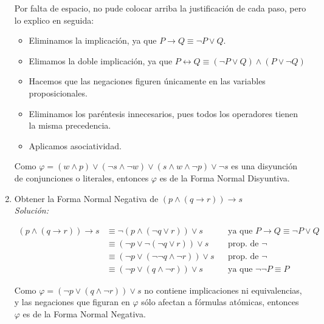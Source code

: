 \documentclass[letterpaper,10pt]{article}
\begin{document}
\begin{enumerate}
        Por falta de espacio, no pude colocar arriba la justificación de cada 
        paso, pero lo explico en seguida:

        \begin{itemize}
            \item Eliminamos la implicación, ya que 
            $P \rightarrow Q \equiv \neg P \lor Q$.
            \item Elimamos la doble implicación, ya que 
            $P \leftrightarrow Q \equiv (\neg P \lor Q) \land (P \lor \neg Q)$
            \item Hacemos que las negaciones figuren únicamente en las variables
            proposicionales.
            \item Eliminamos los paréntesis innecesarios, pues todos los
            operadores tienen la misma precedencia.
            \item Aplicamos asociatividad.
        \end{itemize}

        Como $\varphi = (w \land p) \lor (\neg s \land \neg w) \lor (s \land w
        \land \neg p) \lor \neg s$ es una disyunción de conjunciones o
        literales, entonces $\varphi$ es de la Forma Normal Disyuntiva.
        
        \newpage
        \item Obtener la Forma Normal Negativa de 
        $(p \land (q \rightarrow r)) \rightarrow s$ \\
        \textit{Solución:}

        \begin{align*}
            (p \land (q \rightarrow r)) \rightarrow s 
            &\equiv \neg (p \land (\neg q \lor r)) \lor s
            && \text{ya que $P \rightarrow Q \equiv \neg P \lor Q$} \\
            &\equiv (\neg p \lor \neg (\neg q \lor r)) \lor s
            && \text{prop. de $\neg$} \\
            &\equiv (\neg p \lor (\neg \neg q \land \neg r)) \lor s
            && \text{{prop. de $\neg$}} \\
            &\equiv (\neg p \lor (q \land \neg r)) \lor s
            && \text{ya que $\neg \neg P \equiv P$}
        \end{align*}

        Como $\varphi = (\neg p \lor (q \land \neg r)) \lor s$ no contiene 
        implicaciones ni equivalencias, y las negaciones que figuran en 
        $\varphi$ sólo afectan a fórmulas atómicas, entonces $\varphi$
        es de la Forma Normal Negativa.
            

\end{enumerate}
\end{document}

